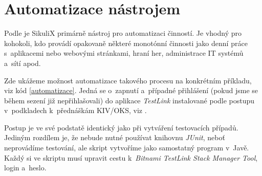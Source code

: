 \chapter{Automatizace nástrojem}
Podle \citep{SikuliX} je SikuliX primárně nástroj pro automatizaci činností. Je vhodný pro kohokoli, kdo provádí opakovaně některé monotónní činnosti jako denní práce s~aplikacemi nebo webovými stránkami, hraní her, administrace IT systémů a~sítí apod.

Zde ukážeme možnost automatizace takového procesu na konkrétním příkladu, viz kód \ref{automatizace}. Jedná se o~zapnutí a~případné přihlášení (pokud jsme se během sezení již nepřihlašovali) do aplikace \emph{TestLink} instalované podle postupu v~podkladech k~přednáškám KIV/OKS, viz \citep{Herout}.

Postup je ve své podstatě identický jako při vytváření testovacích případů. Jediným rozdílem je, že nebude nutné používat knihovnu \emph{JUnit}, neboť neprovádíme testování, ale skript vytvoříme jako samostatný program v~Javě. Každý si ve skriptu musí upravit cestu k~\emph{Bitnami TestLink Stack Manager Tool}, login a~heslo.

